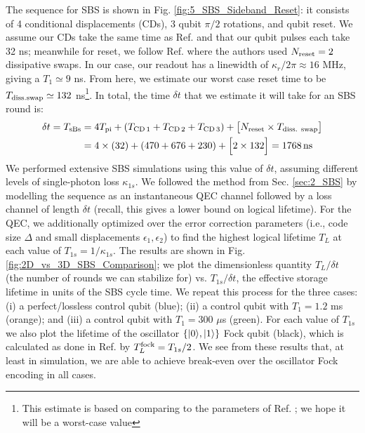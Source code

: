 \noindent The sequence for SBS is shown in Fig. \ref{fig:5_SBS_Sideband_Reset}: it consists of 4 conditional displacements (CDs), 3 qubit $\pi/2$ rotations, and qubit reset. We assume our CDs take the same time as Ref. \cite{sivak2023gkp-expt} and that our qubit pulses each take 32 ns; meanwhile for reset, we follow Ref. \cite{nordquantique2023gkp-expt} where the authors used $N_{\rm reset} = 2$ dissipative swaps. In our case, our readout has a linewidth of $\kappa_r / 2\pi \approx 16$ MHz, giving a $T_1 \simeq 9$ ns. From here, we estimate our worst case reset time to be $T_{\rm diss. swap} \simeq 132$ ns\footnote{This estimate is based on comparing to the parameters of Ref. \cite{nordquantique2023gkp-expt}; we hope it will be a worst-case value}. In total, the time $\delta t$ that we estimate it will take for an SBS round is:
\begin{align*}
\delta t = T_{\rm sBs}  &= 4T_{\rm pi} + (T_{\rm CD\,1} + T_{\rm CD\,2} + T_{\rm CD\,3}) + \big[N_{\text{reset}}\times T_{\text{diss. swap}}\big] \\ &= 4\times (32) + (470 + 676 + 230) + \Big[2 \times 132\Big] = 1768\, {\rm ns}
\end{align*}
We performed extensive SBS simulations using this value of $\delta t$, assuming different levels of single-photon loss $\kappa_{1s}$. We followed the method from Sec. \ref{sec:2_SBS} by modelling the sequence as an instantaneous QEC channel followed by a loss channel of length $\delta t$ (recall, this gives a lower bound on logical lifetime). For the QEC, we additionally optimized over the error correction parameters (i.e., code size $\Delta$ and small displacements $\epsilon_1, \epsilon_2$) to find the highest logical lifetime $T_L$ at each value of $T_{1s} = 1/\kappa_{1s}$. The results are shown in Fig. \ref{fig:2D_vs_3D_SBS_Comparison}; we plot the dimensionless quantity $T_L/\delta t$ (the number of rounds we can stabilize for) vs. $T_{1s}/\delta t$, the effective storage lifetime in units of the SBS cycle time. We repeat this process for the three cases: (i) a perfect/lossless control qubit (blue); (ii) a control qubit with $T_1 = 1.2$ ms (orange); and (iii) a control qubit with $T_1 = 300$ $\mu$s (green). For each value of $T_{1s}$ we also plot the lifetime of the oscillator $\{\lvert0\rangle, \lvert1\rangle\}$ Fock qubit (black), which is calculated as done in Ref. \cite{royer2020gkp} by $T_L^{\rm fock} = T_{1s}/2$. We see from these results that, at least in simulation, we are able to achieve break-even over the oscillator Fock encoding in all cases. 

